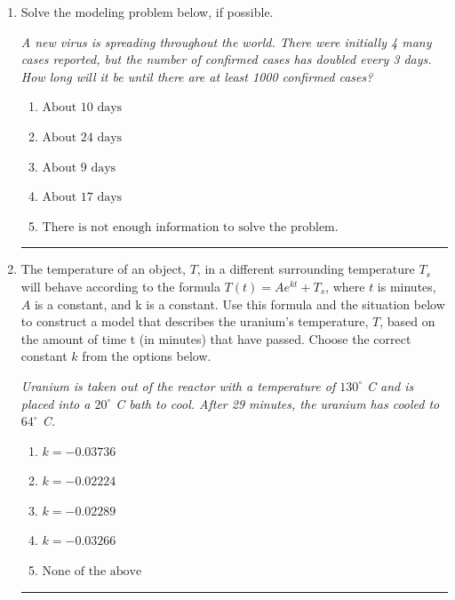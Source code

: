 \documentclass[14pt]{extbook}
\newcommand{\litem}[1]{\item#1\hspace*{-1cm}\rule{\textwidth}{0.4pt}}
\begin{document}
\begin{enumerate}
{\begin{enumerate}[label=\Alph*.]
\end{enumerate} }
\litem{
Solve the modeling problem below, if possible.
\begin{center}
    \textit{ A new virus is spreading throughout the world. There were initially 4 many cases reported, but the number of confirmed cases has doubled every 3 days. How long will it be until there are at least 1000 confirmed cases? }
\end{center}
\begin{enumerate}[label=\Alph*.]
\item \( \text{About } 10 \text{ days} \)
\item \( \text{About } 24 \text{ days} \)
\item \( \text{About } 9 \text{ days} \)
\item \( \text{About } 17 \text{ days} \)
\item \( \text{There is not enough information to solve the problem.} \)

\end{enumerate} }
\litem{
The temperature of an object, $T$, in a different surrounding temperature $T_s$ will behave according to the formula $T(t) = Ae^{kt} + T_s$, where $t$ is minutes, $A$ is a constant, and k is a constant. Use this formula and the situation below to construct a model that describes the uranium's temperature, $T$, based on the amount of time t (in minutes) that have passed. Choose the correct constant $k$ from the options below.
\begin{center}
    \textit{ Uranium is taken out of the reactor with a temperature of $130^{\circ}$ C and is placed into a $20^{\circ}$ C bath to cool. After 29 minutes, the uranium has cooled to $64^{\circ}$ C. }
\end{center}
\begin{enumerate}[label=\Alph*.]
\item \( k = -0.03736 \)
\item \( k = -0.02224 \)
\item \( k = -0.02289 \)
\item \( k = -0.03266 \)
\item \( \text{None of the above} \)


\end{enumerate}}
\end{enumerate}
\end{document}
